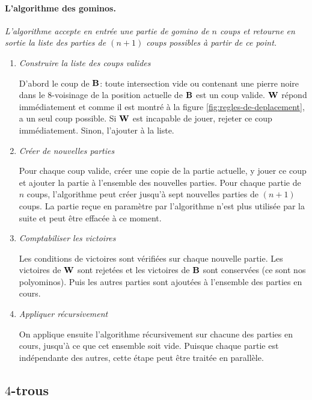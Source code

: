 \paragraph{\bf L'algorithme des gominos.} {\it L'algorithme accepte en entrée une partie de gomino de $n$ coups et retourne en sortie la liste des parties de $(n+1)$ coups possibles à partir de ce point.

\vspace{-0.5em}
\begin{enumerate}
\item \emph {Construire la liste des coups valides}

D'abord le coup de $\mathbf{B}$: toute intersection vide ou contenant une pierre noire dans le $8$-voisinage de la position actuelle de $\mathbf{B}$ est un coup valide. $\mathbf{W}$ répond immédiatement et comme il est montré à la figure \ref{fig:regles-de-deplacement}, a un seul coup possible. Si $\mathbf{W}$ est incapable de jouer, rejeter ce coup immédiatement. Sinon, l'ajouter à la liste.

\item \emph{Créer de nouvelles parties}

Pour chaque coup valide, créer une copie de la partie actuelle, y jouer ce coup et ajouter la partie à l'ensemble des nouvelles parties. Pour chaque partie de $n$ coups, l'algorithme peut créer jusqu'à sept nouvelles parties de $(n+1)$ coups. La partie reçue en paramètre par l'algorithme n'est plus utilisée par la suite et peut être effacée à ce moment.

\item \emph{Comptabiliser les victoires}

Les conditions de victoires sont vérifiées sur chaque nouvelle partie. Les victoires de $\mathbf{W}$ sont rejetées et les victoires de $\mathbf{B}$ sont conservées (ce sont nos polyominos). Puis les autres parties sont ajoutées à l'ensemble des parties en cours.

\item \emph{Appliquer récursivement}

On applique ensuite l'algorithme récursivement sur chacune des parties en cours, jusqu'à ce que cet ensemble soit vide. Puisque chaque partie est indépendante des autres, cette étape peut être traitée en parallèle.
\end{enumerate}

}


\vspace{-0.5em}
\subsection{$4$-trous} \label{subsection:4-trous}

